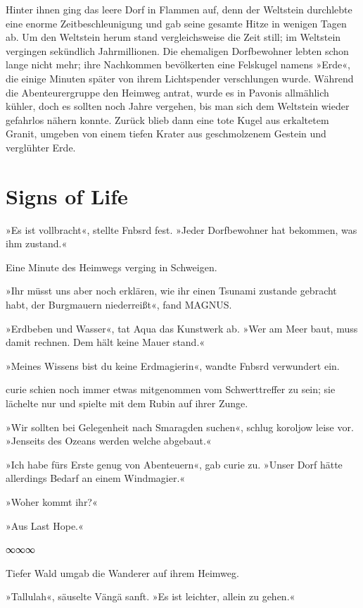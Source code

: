 Hinter ihnen ging das leere Dorf in Flammen auf, denn der Weltstein durchlebte eine enorme Zeitbeschleunigung und gab seine gesamte Hitze in wenigen Tagen ab. Um den Weltstein herum stand vergleichsweise die Zeit still; im Weltstein vergingen sekündlich Jahrmillionen. Die ehemaligen Dorfbewohner lebten schon lange nicht mehr; ihre Nachkommen bevölkerten eine Felskugel namens »Erde«, die einige Minuten später von ihrem Lichtspender verschlungen wurde. Während die Abenteurergruppe den Heimweg antrat, wurde es in Pavonis allmählich kühler, doch es sollten noch Jahre vergehen, bis man sich dem Weltstein wieder gefahrlos nähern konnte. Zurück blieb dann eine tote Kugel aus erkaltetem Granit, umgeben von einem tiefen Krater aus geschmolzenem Gestein und verglühter Erde.


\chapter{Signs of Life}

»Es ist vollbracht«, stellte Fnbsrd fest. »Jeder Dorfbewohner hat bekommen, was ihm zustand.«

Eine Minute des Heimwegs verging in Schweigen.

»Ihr müsst uns aber noch erklären, wie ihr einen Tsunami zustande gebracht habt, der Burgmauern niederreißt«, fand MAGNUS.

»Erdbeben und Wasser«, tat Aqua das Kunstwerk ab. »Wer am Meer baut, muss damit rechnen. Dem hält keine Mauer stand.«

»Meines Wissens bist du keine Erdmagierin«, wandte Fnbsrd verwundert ein.

curie schien noch immer etwas mitgenommen vom Schwerttreffer zu sein; sie lächelte nur und spielte mit dem Rubin auf ihrer Zunge.

»Wir sollten bei Gelegenheit nach Smaragden suchen«, schlug koroljow leise vor. »Jenseits des Ozeans werden welche abgebaut.«

»Ich habe fürs Erste genug von Abenteuern«, gab curie zu. »Unser Dorf hätte allerdings Bedarf an einem Windmagier.«

»Woher kommt ihr?«

»Aus Last Hope.«

\begin{center}
∞∞∞
\end{center}

Tiefer Wald umgab die Wanderer auf ihrem Heimweg.

»Tallulah«, säuselte Vängä sanft. »Es ist leichter, allein zu gehen.«

